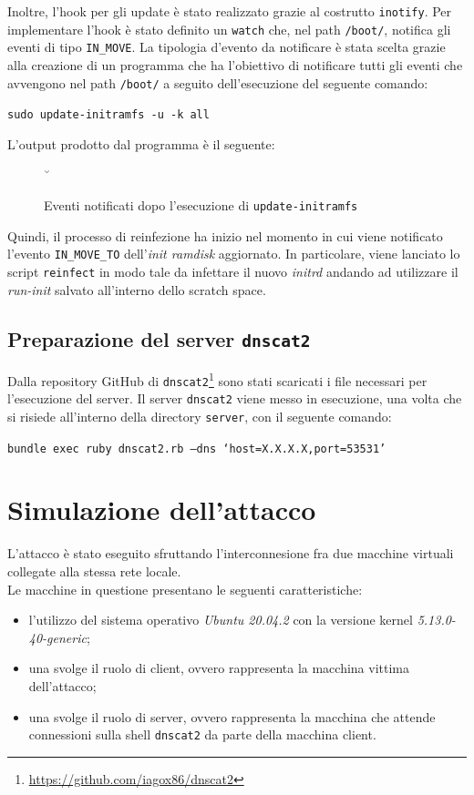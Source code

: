 \documentclass[oneside]{article}
\begin{document}
Inoltre, l'hook per gli update è stato realizzato grazie al costrutto \texttt{inotify}. Per implementare l'hook è stato definito un \texttt{watch} che, nel path \texttt{/boot/}, notifica gli eventi di tipo \texttt{IN\_MOVE}. La tipologia d'evento da notificare è stata scelta grazie alla creazione di un programma che ha l'obiettivo di notificare tutti gli eventi che avvengono nel path \texttt{/boot/} a seguito dell'esecuzione del seguente comando:
\begin{center}
\texttt{sudo update-initramfs -u -k all}
\end{center}
L'output prodotto dal programma è il seguente:
\begin{figure}[ht!]
\centering
{}˘
\caption{Eventi notificati dopo l'esecuzione di \texttt{update-initramfs}}
\end{figure}

\newpage
Quindi, il processo di reinfezione ha inizio nel momento in cui viene notificato l'evento \texttt{IN\_MOVE\_TO} dell'\textit{init ramdisk} aggiornato. In particolare, viene lanciato lo script \texttt{reinfect} in modo tale da infettare il nuovo \textit{initrd} andando ad utilizzare il \textit{run-init} salvato all'interno dello scratch space.

\subsection{Preparazione del server \texttt{dnscat2}}
Dalla repository GitHub di \texttt{dnscat2}\footnote{\url{https://github.com/iagox86/dnscat2}} sono stati scaricati i file necessari per l'esecuzione del server. Il server \texttt{dnscat2} viene messo in esecuzione, una volta che si risiede all'interno della directory \texttt{server}, con il seguente comando:
\begin{center}
\texttt{bundle exec ruby dnscat2.rb --dns `host=X.X.X.X,port=53531'}
\end{center}

\section{Simulazione dell'attacco}
L'attacco è stato eseguito sfruttando l'interconnesione fra due macchine virtuali collegate alla stessa rete locale.\\ Le macchine in questione presentano le seguenti caratteristiche: 
\begin{itemize}
\item l'utilizzo del sistema operativo \textit{Ubuntu 20.04.2} con la versione kernel \textit{5.13.0-40-generic};
\item una svolge il ruolo di client, ovvero rappresenta la macchina vittima dell'attacco;
\item una svolge il ruolo di server, ovvero rappresenta la macchina che attende connessioni sulla shell \texttt{dnscat2} da parte della macchina client.
\end{itemize}
\end{document}
